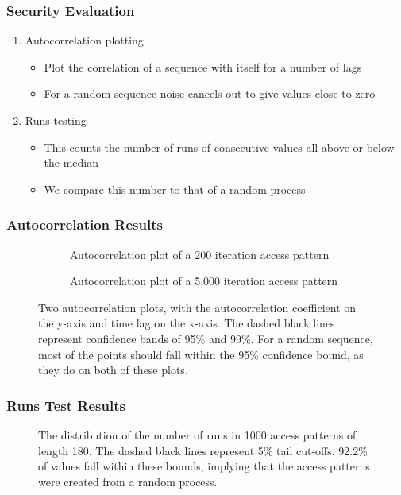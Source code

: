\documentclass{beamer}
\begin{document}
\begin{frame}
    \frametitle{Security Evaluation}
    \begin{enumerate}
        \item Autocorrelation plotting
            \begin{itemize}
                \item Plot the correlation of a sequence with itself for a number of lags
                \item For a random sequence noise cancels out to give values close to zero
            \end{itemize}
        \item Runs testing
            \begin{itemize}
                \item This counts the number of runs of consecutive values all above or below the median
                \item We compare this number to that of a random process
            \end{itemize}
    \end{enumerate}
\end{frame}

\begin{frame}
    \frametitle{Autocorrelation Results}
    \begin{figure}
        \centering
        \begin{subfigure}{0.5\textwidth}
            \centering
            \scalebox{0.4}{}
            \caption{Autocorrelation plot of a 200 iteration access pattern}
            \label{fig:shortAutocorr}
        \end{subfigure}%
        \begin{subfigure}{0.5\textwidth}
            \centering
            \scalebox{0.4}{}
            \caption{Autocorrelation plot of a 5,000 iteration access pattern}
            \label{fig:longAutocorr}
        \end{subfigure}
        \caption{Two autocorrelation plots, with the autocorrelation coefficient on the y-axis and time lag on the x-axis. The dashed black lines represent confidence bands of 95\% and 99\%. For a random sequence, most of the points should fall within the 95\% confidence bound, as they do on both of these plots.}
        \label{fig:autocorr}
    \end{figure}
\end{frame}

\begin{frame}
    \frametitle{Runs Test Results}
    \begin{figure}
        \centering
        \scalebox{0.5}{}
        \caption{The distribution of the number of runs in 1000 access patterns of length 180. The dashed black lines represent 5\% tail cut-offs. 92.2\% of values fall within these bounds, implying that the access patterns were created from a random process.}
        \label{fig:runsTestPlot}
    \end{figure}
\end{frame}
\end{document}
